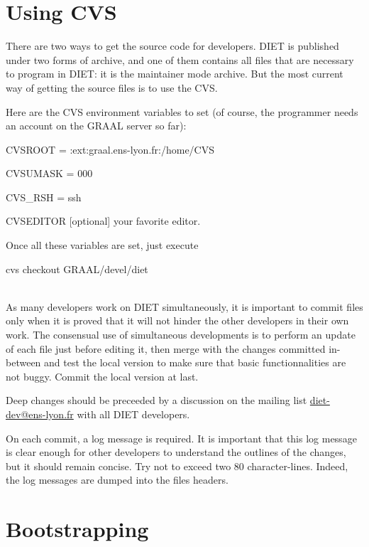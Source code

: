 

\section{Using CVS}

There are two ways to get the source code for developers. DIET is
published under two forms of archive, and one of them contains all
files that are necessary to program in DIET: it is the maintainer mode
archive. But the most current way of getting the source files is to
use the CVS.

Here are the CVS environment variables to set (of course, the
programmer needs an account on the GRAAL server so far):
\begin{description}
\item{\sf CVSROOT} \textsf{ = :ext:graal.ens-lyon.fr:/home/CVS}
\item{\sf CVSUMASK} \textsf{ = 000}
\item{\sf CVS\_RSH} \textsf{ = ssh}
\item{\sf CVSEDITOR [optional]} your favorite editor.
\end{description}

Once all these variables are set, just execute\\
\centerline{\sf cvs checkout GRAAL/devel/diet}\\


As many developers work on DIET simultaneously, it is important to
commit files only when it is proved that it will not hinder the other
developers in their own work. The consensual use of simultaneous
developments is to perform an update of each file just before editing
it, then merge with the changes committed in-between and test the
local version to make sure that basic functionnalities are not
buggy. Commit the local version at last.

Deep changes should be preceeded by a discussion on the mailing list
\url{diet-dev@ens-lyon.fr} with all DIET developers.

On each commit, a log message is required. It is important that this
log message is clear enough for other developers to understand the
outlines of the changes, but it should remain concise. Try not to
exceed two 80 character-lines.  Indeed, the log messages are dumped
into the files headers.


\section{Bootstrapping}

